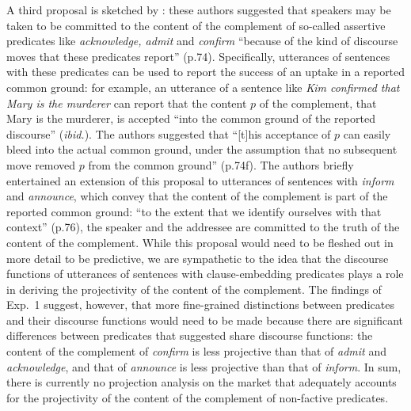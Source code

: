 \documentclass[11pt,fleqn]{article}
\newcommand{\6}{\mbox{$[\hspace*{-.6mm}[$}}
\newcommand{\9}{\mbox{$]\hspace*{-.6mm}]$}}
\begin{document}
{A third proposal is sketched by \citet{anand-hacquard2014}: these authors suggested that speakers may be taken to be committed to the content of the complement of so-called assertive predicates like {\em acknowledge, admit} and {\em confirm} ``because of the kind of discourse moves that these predicates report'' (p.74). Specifically, utterances of sentences with these predicates can be used to report the success of an uptake in a reported common ground: for example, an utterance of a sentence like {\em Kim confirmed that Mary is the murderer} can report that the content $p$ of the  complement, that Mary is the murderer, is accepted ``into the common ground of the reported discourse'' ({\em ibid.}). The authors suggested that ``[t]his acceptance of $p$ can easily bleed into the actual common ground, under the assumption that no subsequent move removed $p$ from the common ground'' (p.74f). The authors briefly entertained an extension of this proposal to utterances of sentences with {\em inform} and {\em announce}, which convey that the content of the complement is part of the reported common ground: ``to the extent that we identify ourselves with that context'' (p.76), the speaker and the addressee are committed to the truth of the content of the complement. While this proposal would need to be fleshed out in more detail to be predictive, we are sympathetic to the idea that the discourse functions of utterances of sentences with clause-embedding predicates plays a role in deriving the projectivity of the content of the complement. The findings of Exp.~1 suggest, however, that more fine-grained distinctions between predicates and their discourse functions would need to be made because there are significant differences between predicates that \citet{anand-hacquard2014} suggested share discourse functions: the content of the complement of {\em confirm} is less projective than that of {\em admit} and {\em acknowledge}, and that of {\em announce} is less projective than that of {\em inform}. In sum, there is currently no projection analysis on the market that adequately accounts for the projectivity of the content of the complement of non-factive predicates. 

}
\end{document}
